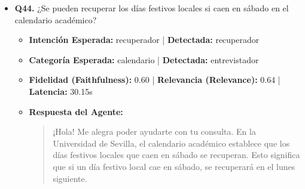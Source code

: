 \documentclass[12pt,a4paper,oneside]{report}
\begin{document}
\begin{itemize}
  
\item \textbf{Q44.} ¿Se pueden recuperar los días festivos locales si caen en sábado en el calendario académico? \\
        \begin{itemize}
          \item \textbf{Intención Esperada:} recuperador | \textbf{Detectada:} recuperador
          \item \textbf{Categoría Esperada:} calendario | \textbf{Detectada:} entrevistador
          \item \textbf{Fidelidad (Faithfulness):} 0.60 | \textbf{Relevancia (Relevance):} 0.64 | \textbf{Latencia:} 30.15s
          \item \textbf{{Respuesta del Agente:}} \\
                \begin{quote}
¡Hola! Me alegra poder ayudarte con tu consulta. En la Universidad de Sevilla, el calendario académico establece que los días festivos locales que caen en sábado se recuperan. Esto significa que si un día festivo local cae en sábado, se recuperará en el lunes siguiente.


\end{quote}
\end{itemize}
\end{itemize}
\end{document}
